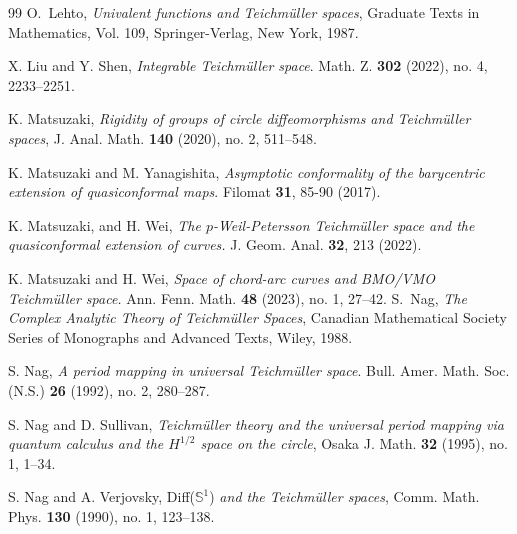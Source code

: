 \documentclass[12pt]{amsart}
\theoremstyle{plain}
\theoremstyle{definition}
\theoremstyle{remark}
\numberwithin{equation}{section} %
\numberwithin{figure}{section} %
\begin{document}
\begin{thebibliography}{99}
O.~Lehto, {\it Univalent functions and {T}eichm\"uller spaces}, Graduate Texts
  in Mathematics, Vol. 109, Springer-Verlag, New York, 1987.


  X. Liu and Y. Shen, {\it Integrable Teichmüller space}. Math. Z. {\bf 302} (2022), no. 4, 2233–2251.




 K. Matsuzaki, {\it Rigidity of groups of circle diffeomorphisms and Teichmüller spaces},
J. Anal. Math. {\bf 140} (2020), no. 2, 511--548.

 K. Matsuzaki and M. Yanagishita, {\it Asymptotic conformality of the barycentric extension of quasiconformal
maps}. Filomat {\bf 31}, 85-90 (2017).


 K. Matsuzaki, and H. Wei, {\it The \(p\)-Weil-Petersson Teichmüller space and the quasiconformal extension of curves.} J. Geom. Anal. {\bf 32}, 213 (2022).

K. Matsuzaki and H. Wei, {\it Space of chord-arc curves and \emph{BMO/VMO} Teichmüller space.} Ann. Fenn. Math. {\bf 48} (2023), no. 1, 27–42.
S.~Nag, {\it The Complex Analytic Theory of Teichm{\"u}ller Spaces}, Canadian
  Mathematical Society Series of Monographs and Advanced Texts, Wiley, 1988.

 S. Nag, {\it A period mapping in universal Teichmüller space}.
  Bull. Amer. Math. Soc. (N.S.) {\bf 26} (1992), no. 2, 280--287.

  S. Nag and D. Sullivan, {\it Teichm\"uller theory and the universal period mapping via quantum calculus and the $H^{1/2}$ space on the circle}, Osaka J. Math. {\bf 32} (1995), no. 1, 1--34.

 S. Nag and A. Verjovsky, Diff($\mathbb{S}^1$) {\it and the Teichm\"uller spaces}, Comm. Math. Phys. {\bf{130}} (1990), no. 1, 123--138.



\end{thebibliography}
\end{document}
